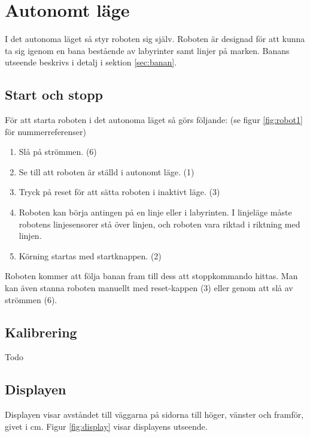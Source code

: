 
%
%

\section{Autonomt läge}
I det autonoma läget så styr roboten sig själv. Roboten är designad för att kunna ta sig igenom en bana bestående av labyrinter samt linjer på marken. Banans utseende beskrivs i detalj i sektion \ref{sec:banan}.

\subsection{Start och stopp}
För att starta roboten i det autonoma läget så görs följande: (se figur \ref{fig:robot1} för nummerreferenser)

\begin{enumerate}
\item Slå på strömmen. (6)
\item Se till att roboten är ställd i autonomt läge. (1)
\item Tryck på reset för att sätta roboten i inaktivt läge. (3)
\item Roboten kan börja antingen på en linje eller i labyrinten. I linjeläge måste robotens linjesensorer stå över linjen, och roboten vara riktad i riktning med linjen. 
\item Körning startas med startknappen. (2)
\end{enumerate}

Roboten kommer att följa banan fram till dess att stoppkommando hittas. Man kan även stanna roboten manuellt med reset-kappen (3) eller genom att slå av strömmen (6). 

\subsection{Kalibrering}
Todo

\subsection{Displayen}
Displayen visar avståndet till väggarna på sidorna till höger, vänster och framför, givet i cm. Figur \ref{fig:display} visar displayens utseende. 

